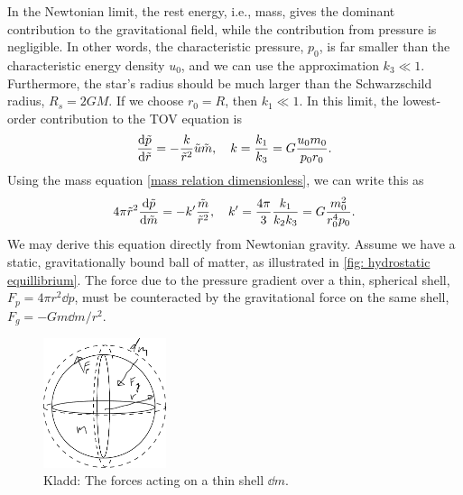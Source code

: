 In the Newtonian limit, the rest energy, i.e., mass, gives the dominant contribution to the gravitational field, while the contribution from pressure is negligible. 
In other words, the characteristic pressure, $p_0$, is far smaller than the characteristic energy density $u_0$, and we can use the approximation $k_3 \ll 1$.
Furthermore, the star's radius should be much larger than the Schwarzschild radius, $R_s = 2 G M$.
If we choose $r_0 = R$, then $ k_1 \ll 1$.
In this limit, the lowest-order contribution to the TOV equation is
%
\begin{equation}
    \label{Newtonian limit TOV}
    \odv{\tilde p}{\tilde r} = - \frac{k}{\tilde r^2}\tilde u \tilde m, \quad
    k = \frac{k_1}{k_3} =  G \frac{u_0 m_0}{p_0 r_0}.
\end{equation}
%
Using the mass equation \autoref{mass relation dimensionless}, we can write this as
%
\begin{equation}
    4 \pi \tilde r^2 \odv{\tilde p}{\tilde m}
    = - k' \frac{\tilde m}{\tilde r^2}, 
    \quad k' = \frac{4 \pi}{3} \frac{k_1}{k_2 k_3} = G \frac{m_0^2}{r_0^4 p_0}.
\end{equation}
%
We may derive this equation directly from Newtonian gravity.
Assume we have a static, gravitationally bound ball of matter, as illustrated in \autoref{fig: hydrostatic equillibrium}.
The force due to the pressure gradient over a thin, spherical shell, $F_p = 4 \pi r^2 \dd p$, must be counteracted by the gravitational force on the same shell, $F_g = - G m \dd m / r^2$.

\begin{figure}[h]
    \centering
    \includegraphics[width=0.32\textwidth]{figurer/hydrostatic_equillibrium.pdf}
    \caption{Kladd: The forces acting on a thin shell $\dd m$.}
    \label{fig: hydrostatic equillibrium}
\end{figure}

